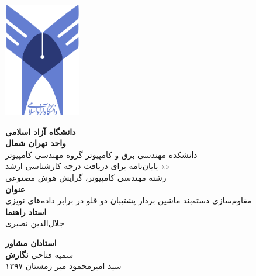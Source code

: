 \thispagestyle{empty}

\centerline{\includegraphics[height=5cm]{logo.png}}

\begin{center}
\vspace{0.5cm}

\textbf{دانشگاه آزاد اسلامی}
\\[.2cm]
\textbf{واحد تهران شمال}
\\[0.5cm]

دانشکده مهندسی برق و کامپیوتر گروه مهندسی کامپیوتر
\\[.5cm]
پایان‌نامه برای دریافت درجه کارشناسی ارشد «»
\\[.2cm]
رشته مهندسی کامپیوتر، گرایش هوش مصنوعی
\\[0.5cm]

{\Large
\textbf{عنوان}
}
\\
مقاوم‌سازی دسته‌بند ماشین بردار پشتیبان دو قلو در برابر داده‌های نویزی
\\[0.5cm]

{\Large
	\textbf{استاد راهنما}
}
\\
جلال‌ا‌لدین نصیری
\vskip 0.5cm

{\Large
	\textbf{استادان مشاور}
}
\\
سمیه فتاحی
\vskip 0.5cm
{\Large
	\textbf{نگارش}
}
\\
سید امیرمحمود میر
\vskip 0.5cm
زمستان ۱۳۹۷
\end{center}